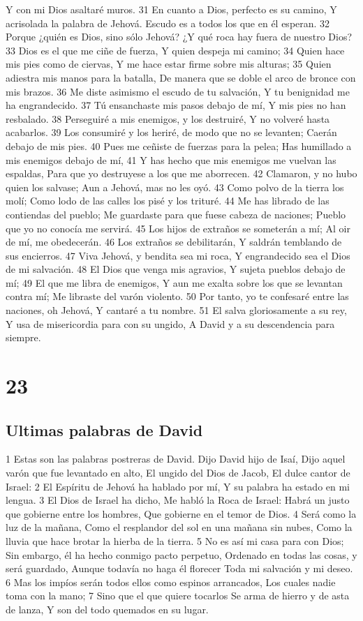 Y con mi Dios asaltaré muros.
31 En cuanto a Dios, perfecto es su camino,
Y acrisolada la palabra de Jehová.
Escudo es a todos los que en él esperan.
32 Porque ¿quién es Dios, sino sólo Jehová?
¿Y qué roca hay fuera de nuestro Dios?
33 Dios es el que me ciñe de fuerza,
Y quien despeja mi camino;
34 Quien hace mis pies como de ciervas, 
Y me hace estar firme sobre mis alturas;
35 Quien adiestra mis manos para la batalla,
De manera que se doble el arco de bronce con mis brazos.
36 Me diste asimismo el escudo de tu salvación,
Y tu benignidad me ha engrandecido.
37 Tú ensanchaste mis pasos debajo de mí,
Y mis pies no han resbalado. 
38 Perseguiré a mis enemigos, y los destruiré,
Y no volveré hasta acabarlos.
39 Los consumiré y los heriré, de modo que no se levanten;
Caerán debajo de mis pies.
40 Pues me ceñiste de fuerzas para la pelea;
Has humillado a mis enemigos debajo de mí,
41 Y has hecho que mis enemigos me vuelvan las espaldas,
Para que yo destruyese a los que me aborrecen.
42 Clamaron, y no hubo quien los salvase;
Aun a Jehová, mas no les oyó.
43 Como polvo de la tierra los molí;
Como lodo de las calles los pisé y los trituré.
44 Me has librado de las contiendas del pueblo;
Me guardaste para que fuese cabeza de naciones;
Pueblo que yo no conocía me servirá.
45 Los hijos de extraños se someterán a mí;
Al oir de mí, me obedecerán.
46 Los extraños se debilitarán,
Y saldrán temblando de sus encierros.
47 Viva Jehová, y bendita sea mi roca,
Y engrandecido sea el Dios de mi salvación.
48 El Dios que venga mis agravios,
Y sujeta pueblos debajo de mí;
49 El que me libra de enemigos,
Y aun me exalta sobre los que se levantan contra mí;
Me libraste del varón violento.
50 Por tanto, yo te confesaré entre las naciones, oh Jehová,
Y cantaré a tu nombre. 
51 El salva gloriosamente a su rey,
Y usa de misericordia para con su ungido,
A David y a su descendencia para siempre.

\chapter{23}

\section*{Ultimas palabras de David}

1 Estas son las palabras postreras de David. 
Dijo David hijo de Isaí,
Dijo aquel varón que fue levantado en alto,
El ungido del Dios de Jacob,
El dulce cantor de Israel:
2 El Espíritu de Jehová ha hablado por mí,
Y su palabra ha estado en mi lengua.
3 El Dios de Israel ha dicho,
Me habló la Roca de Israel:
Habrá un justo que gobierne entre los hombres,
Que gobierne en el temor de Dios.
4 Será como la luz de la mañana,
Como el resplandor del sol en una mañana sin nubes,
Como la lluvia que hace brotar la hierba de la tierra.
5 No es así mi casa para con Dios;
Sin embargo, él ha hecho conmigo pacto perpetuo,
Ordenado en todas las cosas, y será guardado,
Aunque todavía no haga él florecer
Toda mi salvación y mi deseo.
6 Mas los impíos serán todos ellos como espinos arrancados,
Los cuales nadie toma con la mano;
7 Sino que el que quiere tocarlos
Se arma de hierro y de asta de lanza,
Y son del todo quemados en su lugar.

